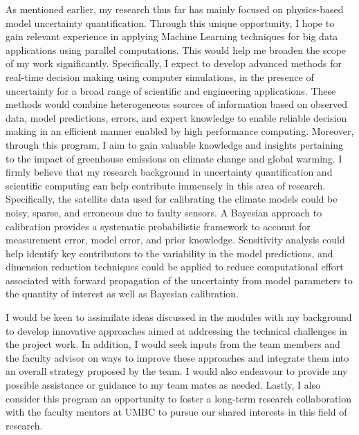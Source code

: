 \documentclass[11pt]{article}
\begin{document}
As mentioned earlier, my research thus far has mainly focused on physics-based model uncertainty 
quantification. Through this unique opportunity, I hope to gain relevant experience in
applying Machine Learning techniques for big data applications using parallel computations. This would help
me broaden the scope of my work significantly. Specifically, I expect to develop advanced methods for
real-time decision making using computer simulations, in the presence of uncertainty for a broad range of
scientific and engineering applications. These methods would combine heterogeneous sources of
information based on observed data, model predictions, errors, and expert knowledge to enable reliable
decision making in an efficient manner enabled by high performance computing. Moreover, through this
program, I aim to gain valuable knowledge and insights pertaining to the  
impact of greenhouse emissions on climate change and global warming. 
I firmly believe that my research
background in uncertainty quantification and scientific computing can help contribute immensely in this
area of research. Specifically, the satellite data used for calibrating the climate models could be noisy, sparse,
and erroneous due to faulty sensors. A Bayesian approach to calibration provides a systematic
probabilistic framework to account for measurement error, model error, and prior knowledge.
Sensitivity analysis could help identify key contributors to the variability in the model predictions, and
dimension reduction techniques could be applied to reduce computational effort associated with
forward propagation of the uncertainty from model parameters to the quantity of interest as well as
Bayesian calibration. 

I would be keen to assimilate ideas discussed in the modules with my background to develop
innovative approaches aimed at addressing the technical challenges in the project work. 
In addition, I would seek inputs from the team members and the faculty advisor on ways to
improve these approaches and integrate them into an overall strategy proposed by the team. I would
also endeavour to provide any possible assistance or guidance to my team mates as needed.
Lastly, I also consider this program an opportunity to foster a long-term research collaboration with the faculty
mentors at UMBC to pursue our shared interests in this field of research. 



\end{document}
